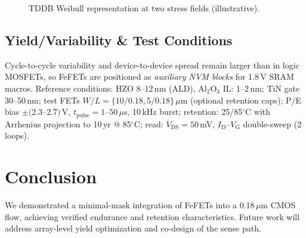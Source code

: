 \documentclass[journal]{IEEEtran}
\begin{document}
\begin{figure}[!t]
\centering
{}
\caption{TDDB Weibull representation at two stress fields (illustrative).}
\end{figure}

\subsection*{Yield/Variability \& Test Conditions}
Cycle-to-cycle variability and device-to-device spread remain larger than in logic MOSFETs, so FeFETs are positioned as \emph{auxiliary NVM blocks} for 1.8\,V SRAM macros. Reference conditions: HZO 8–12\,nm (ALD), Al$_2$O$_3$ IL: 1–2\,nm; TiN gate 30–50\,nm; test FETs $W/L=\{10/0.18,5/0.18\}\,\mu$m (optional retention caps); P/E bias $\pm(2.3$–$2.7)$\,V, $t_{\mathrm{pulse}}=1$–$50\,\mu$s, 10\,kHz burst; retention: 25/85$^\circ$C with Arrhenius projection to 10\,yr @ 85$^\circ$C; read: $V_{\mathrm{DS}}=50$\,mV, $I_{\mathrm{D}}$–$V_{\mathrm{G}}$ double-sweep (2 loops).

\section{Conclusion}
We demonstrated a minimal-mask integration of FeFETs into a 0.18\,$\mu$m CMOS flow, achieving verified endurance and retention characteristics. Future work will address array-level yield optimization and co-design of the sense path.
\end{document}
